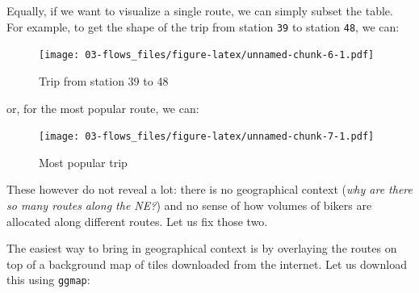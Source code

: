 \documentclass[]{book}
\newenvironment{Shaded}{\begin{snugshade}}{\end{snugshade}}
\newcommand{\KeywordTok}[1]{\textcolor[rgb]{0.13,0.29,0.53}{\textbf{#1}}}
\newcommand{\DecValTok}[1]{\textcolor[rgb]{0.00,0.00,0.81}{#1}}
\newcommand{\StringTok}[1]{\textcolor[rgb]{0.31,0.60,0.02}{#1}}
\newcommand{\OperatorTok}[1]{\textcolor[rgb]{0.81,0.36,0.00}{\textbf{#1}}}
\newcommand{\NormalTok}[1]{#1}
\begin{document}
Equally, if we want to visualize a single route, we can simply subset
the table. For example, to get the shape of the trip from station
\texttt{39} to station \texttt{48}, we can:

\begin{Shaded}
\end{Shaded}

\begin{figure}
\centering
\texttt{[image: 03-flows\_files/figure-latex/unnamed-chunk-6-1.pdf]}
\caption{\label{fig:unnamed-chunk-6}Trip from station 39 to 48}
\end{figure}

or, for the most popular route, we can:

\begin{Shaded}
\end{Shaded}

\begin{figure}
\centering
\texttt{[image: 03-flows\_files/figure-latex/unnamed-chunk-7-1.pdf]}
\caption{\label{fig:unnamed-chunk-7}Most popular trip}
\end{figure}

These however do not reveal a lot: there is no geographical context
(\emph{why are there so many routes along the NE?}) and no sense of how
volumes of bikers are allocated along different routes. Let us fix those
two.

The easiest way to bring in geographical context is by overlaying the
routes on top of a background map of tiles downloaded from the internet.
Let us download this using \texttt{ggmap}:
\end{document}
